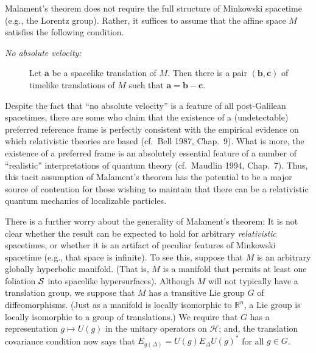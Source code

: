 \documentclass[12pt]{article}
\theoremstyle{remark}
\newcommand{\hil}[1]{\mathcal{#1}}
\begin{document}
Malament's theorem does not require the full structure of Minkowski
spacetime (e.g., the Lorentz group).  Rather, it suffices to assume
that the affine space $M$ satisfies the following condition.
\begin{description}
\item[{\it No absolute velocity:}] Let $\mathbf{a}$ be a spacelike
  translation of $M$.  Then there is a pair $(\mathbf{b},\mathbf{c})$
  of timelike translations of $M$ such that
  $\mathbf{a}=\mathbf{b}-\mathbf{c}$.
\end{description}
Despite the fact that ``no absolute velocity'' is a feature of all
post-Galilean spacetimes, there are some who claim that the existence
of a (undetectable) preferred reference frame is perfectly consistent
with the empirical evidence on which relativistic theories are based
(cf.~Bell 1987, Chap.~9).  What is more, the existence of a preferred
frame is an absolutely essential feature of a number of ``realistic''
interpretations of quantum theory (cf.~Maudlin 1994, Chap.~7).  Thus,
this tacit assumption of Malament's theorem has the potential to be a
major source of contention for those wishing to maintain that there
can be a relativistic quantum mechanics of localizable particles.

There is a further worry about the generality of Malament's theorem:
It is not clear whether the result can be expected to hold for
arbitrary \emph{relativistic} spacetimes, or whether it is an artifact
of peculiar features of Minkowski spacetime (e.g., that space is
infinite).  To see this, suppose that $M$ is an arbitrary globally
hyperbolic manifold.  (That is, $M$ is a manifold that permits at
least one foliation $\cal{S}$ into spacelike hypersurfaces).  Although
$M$ will not typically have a translation group, we suppose that $M$
has a transitive Lie group $G$ of diffeomorphisms.  (Just as a
manifold is locally isomorphic to $\mathbb{R}^{n}$, a Lie group is
locally isomorphic to a group of translations.)  We require that $G$
has a representation $g\mapsto U(g)$ in the unitary operators on
$\hil{H}$; and, the translation covariance condition now says that
$E_{g(\Delta )}=U(g)E_{\Delta}U(g)^{*}$ for all $g\in G$.
\end{document}
